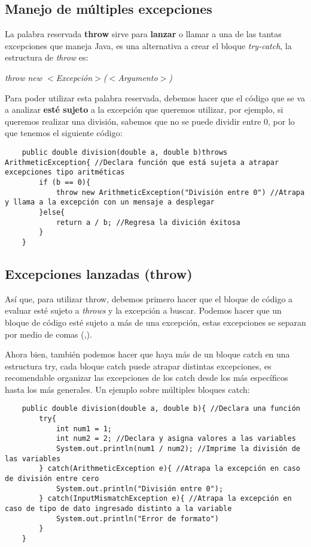 \subsection{Manejo de múltiples excepciones}
\hspace{0.55cm}La palabra reservada \textbf{throw} sirve para \textbf{lanzar} o llamar a una de las tantas excepciones que maneja Java, es una alternativa a crear el bloque \textit{try-catch}, la estructura de \textit{throw} es:
\begin{center}
    \textit{throw new $<$Excepción$>$($<$Argumento$>$)}
\end{center}

Para poder utilizar esta palabra reservada, debemos hacer que el código que se va a analizar \textbf{esté sujeto} a la excepción que queremos utilizar, por ejemplo, si queremos realizar una división, sabemos que no se puede dividir entre 0, por lo que tenemos el siguiente código:
\begin{lstlisting}
    public double division(double a, double b)throws ArithmeticException{ //Declara función que está sujeta a atrapar excepciones tipo aritméticas
        if (b == 0){
            throw new ArithmeticException("División entre 0") //Atrapa y llama a la excepción con un mensaje a desplegar
        }else{
            return a / b; //Regresa la divición éxitosa
        }
    }
\end{lstlisting}


\subsection{Excepciones lanzadas (throw)}
\hspace{0.55cm}Así que, para utilizar throw, debemos primero hacer que el bloque de código a evaluar esté sujeto a \textit{throws} y la excepción a buscar. Podemos hacer que un bloque de código esté sujeto a más de una excepción, estas excepciones se separan por medio de comas (,).

Ahora bien, también podemos hacer que haya más de un bloque catch en una estructura try, cada bloque catch puede atrapar distintas excepciones, es recomendable organizar las excepciones de los catch desde los más específicos hasta los más generales. Un ejemplo sobre múltiples bloques catch:
\begin{lstlisting}
    public double division(double a, double b){ //Declara una función
        try{
            int num1 = 1;
            int num2 = 2; //Declara y asigna valores a las variables
            System.out.println(num1 / num2); //Imprime la división de las variables
        } catch(ArithmeticException e){ //Atrapa la excepción en caso de división entre cero
            System.out.println("División entre 0");
        } catch(InputMismatchException e){ //Atrapa la excepción en caso de tipo de dato ingresado distinto a la variable
            System.out.println("Error de formato")
        }
    }
\end{lstlisting}


